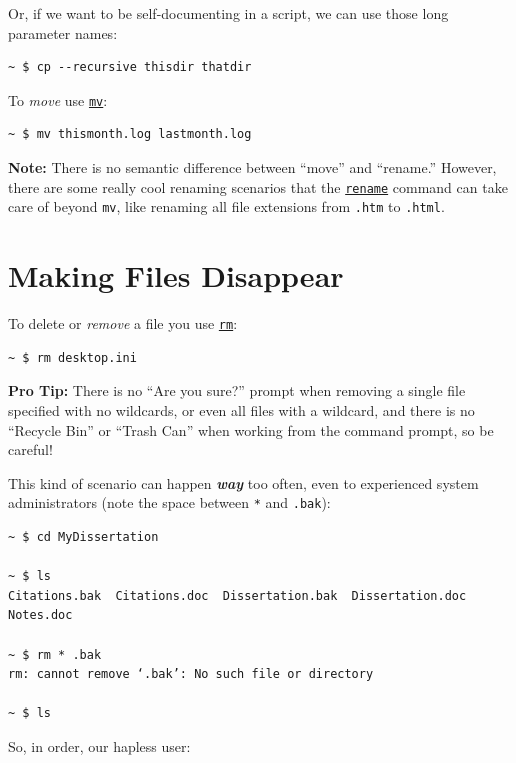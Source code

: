 \documentclass[10pt,]{book}
\numberwithin{figure}{chapter}
\begin{document}
Or, if we want to be self-documenting in a script, we can use those long
parameter names:

\begin{verbatim}
~ $ cp --recursive thisdir thatdir
\end{verbatim}

To \emph{move} use \href{http://linux.die.net/man/1/mv}{\texttt{mv}}:

\begin{verbatim}
~ $ mv thismonth.log lastmonth.log
\end{verbatim}

\textbf{Note:} There is no semantic difference between ``move'' and
``rename.'' However, there are some really cool renaming scenarios that
the \href{http://linux.die.net/man/1/rename}{\texttt{rename}} command
can take care of beyond \texttt{mv}, like renaming all file extensions
from \texttt{.htm} to \texttt{.html}.

\section{Making Files Disappear}\label{making-files-disappear}

To delete or \emph{remove} a file you use
\href{http://linux.die.net/man/1/rm}{\texttt{rm}}:

\begin{verbatim}
~ $ rm desktop.ini
\end{verbatim}

\textbf{Pro Tip:} There is no ``Are you sure?'' prompt when removing a
single file specified with no wildcards, or even all files with a
wildcard, and there is no ``Recycle Bin'' or ``Trash Can'' when working
from the command prompt, so be careful!

This kind of scenario can happen \textbf{\emph{way}} too often, even to
experienced system administrators (note the space between \texttt{*} and
\texttt{.bak}):

\begin{verbatim}
~ $ cd MyDissertation

~ $ ls
Citations.bak  Citations.doc  Dissertation.bak  Dissertation.doc  Notes.doc

~ $ rm * .bak
rm: cannot remove ‘.bak’: No such file or directory

~ $ ls
\end{verbatim}

So, in order, our hapless user:
\end{document}
